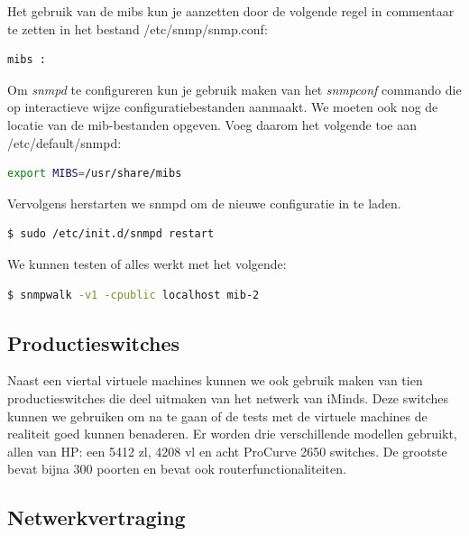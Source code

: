 Het gebruik van de \glspl{mib} kun je aanzetten door de volgende regel in commentaar te zetten in het bestand /etc/snmp/snmp.conf:

\begin{lstlisting}[language=bash]
mibs :
\end{lstlisting}

Om \textit{snmpd} te configureren kun je gebruik maken van het \textit{snmpconf} commando die op interactieve wijze configuratiebestanden aanmaakt.
We moeten ook nog de locatie van de \gls{mib}-bestanden opgeven. Voeg daarom het volgende toe aan /etc/default/snmpd:

\begin{lstlisting}[language=bash]
export MIBS=/usr/share/mibs
\end{lstlisting}

Vervolgens herstarten we snmpd om de nieuwe configuratie in te laden.

\begin{lstlisting}[language=bash]
$ sudo /etc/init.d/snmpd restart
\end{lstlisting}

We kunnen testen of alles werkt met het volgende:

\begin{lstlisting}[language=bash]
$ snmpwalk -v1 -cpublic localhost mib-2
\end{lstlisting}




\subsection{Productieswitches}


Naast een viertal virtuele machines kunnen we ook gebruik maken van tien productieswitches die deel uitmaken van het netwerk van iMinds.
Deze switches kunnen we gebruiken om na te gaan of de tests met de virtuele machines de realiteit goed kunnen benaderen.
Er worden drie verschillende modellen gebruikt, allen van HP: een 5412 zl, 4208 vl en acht ProCurve 2650 switches.
De grootste bevat bijna 300 poorten en bevat ook routerfunctionaliteiten.

\subsection{Netwerkvertraging}
\label{latency}

